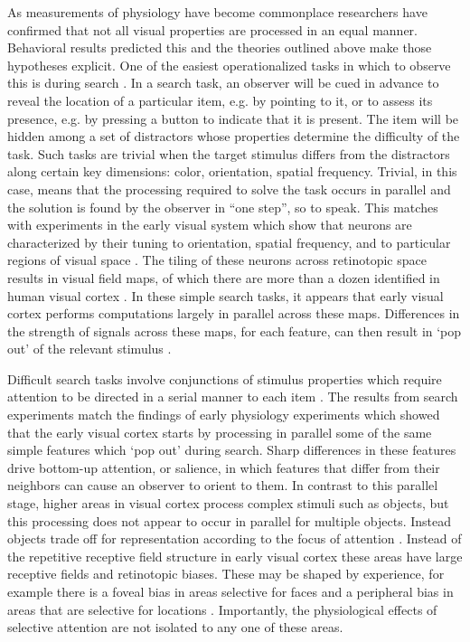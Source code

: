 As measurements of physiology have become commonplace researchers have confirmed that not all visual properties are processed in an equal manner. Behavioral results predicted this \citep{Li2002-ji,Moray1959-fn} and the theories outlined above make those hypotheses explicit. One of the easiest operationalized tasks in which to observe this is during search \citep{Wolfe1994-ew}. In a search task, an observer will be cued in advance to reveal the location of a particular item, e.g. by pointing to it, or to assess its presence, e.g. by pressing a button to indicate that it is present. The item will be hidden among a set of distractors whose properties determine the difficulty of the task. Such tasks are trivial when the target stimulus differs from the distractors along certain key dimensions: color, orientation, spatial frequency. Trivial, in this case, means that the processing required to solve the task occurs in parallel and the solution is found by the observer in “one step”, so to speak. This matches with experiments in the early visual system which show that neurons are characterized by their tuning to orientation, spatial frequency, and to particular regions of visual space \citep{Barlow1957-by,Hubel1962-pn}. The tiling of these neurons across retinotopic space results in visual field maps, of which there are more than a dozen identified in human visual cortex \citep{Wade2002-tt,Wandell2007-pr,Wandell2011-td}. In these simple search tasks, it appears that early visual cortex performs computations largely in parallel across these maps. Differences in the strength of signals across these maps, for each feature, can then result in ‘pop out’ of the relevant stimulus \citep{Nothdurft1993-xt,Treisman1985-dr}. 

Difficult search tasks involve conjunctions of stimulus properties \citep{Egeth1984-ch} which require attention to be directed in a serial manner to each item \citep{Treisman1980-gu}. The results from search experiments match the findings of early physiology experiments \citep{Hubel1959-fo,Hubel1968-na} which showed that the early visual cortex starts by processing in parallel some of the same simple features which `pop out' during search. Sharp differences in these features drive bottom-up attention, or salience, in which features that differ from their neighbors can cause an observer to orient to them. In contrast to this parallel stage, higher areas in visual cortex process complex stimuli such as objects, but this processing does not appear to occur in parallel for multiple objects. Instead objects trade off for representation according to the focus of attention \citep{Desimone1998-wf}. Instead of the repetitive receptive field structure in early visual cortex these areas have large receptive fields and retinotopic biases. These may be shaped by experience, for example there is a foveal bias in areas selective for faces and a peripheral bias in areas that are selective for locations \citep{Levy2001-oe}. Importantly, the physiological effects of selective attention are not isolated to any one of these areas. 


